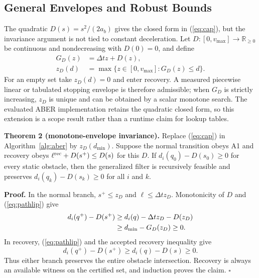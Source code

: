 \documentclass[letterpaper]{article}
\begin{document}
\subsection{General Envelopes and Robust Bounds}

The quadratic $D(s)=s^2/(2a_b)$ gives the closed form in
(\ref{eq:cap}), but the invariance argument is not tied to constant
deceleration.  Let $D:[0,v_{\max}]\to\mathbb R_{\ge0}$ be continuous and
nondecreasing with $D(0)=0$, and define
\begin{equation}
\begin{aligned}
 G_D(z)&=\Delta t z+D(z),\\
 z_D(d)&=\max\{z\in[0,v_{\max}]:G_D(z)\le d\}.
\end{aligned}                                           \label{eq:generalcap}
\end{equation}
For an empty set take $z_D(d)=0$ and enter recovery.  A measured piecewise
linear or tabulated stopping envelope is therefore admissible; when $G_D$ is
strictly increasing, $z_D$ is unique and can be obtained by a scalar monotone
search.  The evaluated ABER implementation retains the quadratic closed form,
so this extension is a scope result rather than a runtime claim for lookup
tables.

\textbf{Theorem 2 (monotone-envelope invariance).}
Replace (\ref{eq:cap}) in Algorithm~\ref{alg:aber} by $z_D(d_{\min})$.
Suppose the normal transition obeys A1 and recovery obeys
$\ell^{\rm rec}+D(s^+)\le D(s)$ for this $D$.  If
$d_i(q_0)-D(s_0)\ge0$ for every static obstacle, then the generalized filter is
recursively feasible and preserves
$d_i(q_k)-D(s_k)\ge0$ for all $i$ and $k$.

\textbf{Proof.}
In the normal branch, $s^+\le z_D$ and $\ell\le\Delta t z_D$.
Monotonicity of $D$ and (\ref{eq:pathlip}) give
\begin{align}
 d_i(q^+)-D(s^+)
 &\ge d_i(q)-\Delta t z_D-D(z_D)\notag\\
 &\ge d_{\min}-G_D(z_D)\ge0.                            \label{eq:generalnormal}
\end{align}
In recovery, (\ref{eq:pathlip}) and the accepted recovery inequality give
\begin{equation}
 d_i(q^+)-D(s^+)\ge d_i(q)-D(s)\ge0.                   \label{eq:generalrec}
\end{equation}
Thus either branch preserves the entire obstacle intersection.  Recovery is
always an available witness on the certified set, and induction proves the
claim. $\square$
\end{document}
